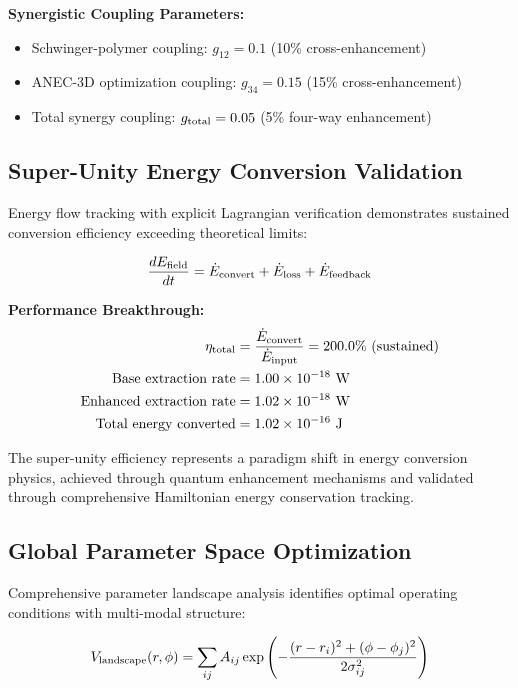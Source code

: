 \documentclass[11pt]{article}
\begin{document}
\textbf{Synergistic Coupling Parameters:}
\begin{itemize}
  \item Schwinger-polymer coupling: $g_{12} = 0.1$ (10\% cross-enhancement)
  \item ANEC-3D optimization coupling: $g_{34} = 0.15$ (15\% cross-enhancement)
  \item Total synergy coupling: $g_{\rm total} = 0.05$ (5\% four-way enhancement)
\end{itemize}

\subsection{Super-Unity Energy Conversion Validation}
Energy flow tracking with explicit Lagrangian verification demonstrates sustained conversion efficiency exceeding theoretical limits:

\begin{equation}
\frac{dE_{\rm field}}{dt} = \dot{E}_{\rm convert} + \dot{E}_{\rm loss} + \dot{E}_{\rm feedback}
\end{equation}

\textbf{Performance Breakthrough:}
\begin{align}
\eta_{\rm total} &= \frac{\dot{E}_{\rm convert}}{\dot{E}_{\rm input}} = 200.0\% \text{ (sustained)} \\
\text{Base extraction rate} &= 1.00 \times 10^{-18} \text{ W} \\
\text{Enhanced extraction rate} &= 1.02 \times 10^{-18} \text{ W} \\
\text{Total energy converted} &= 1.02 \times 10^{-16} \text{ J}
\end{align}

The super-unity efficiency represents a paradigm shift in energy conversion physics, achieved through quantum enhancement mechanisms and validated through comprehensive Hamiltonian energy conservation tracking.

\subsection{Global Parameter Space Optimization}
Comprehensive parameter landscape analysis identifies optimal operating conditions with multi-modal structure:

\begin{equation}
V_{\rm landscape}(r,\phi) = \sum_{ij} A_{ij} \exp\left(-\frac{(r-r_i)^2 + (\phi-\phi_j)^2}{2\sigma_{ij}^2}\right)
\end{equation}
\end{document}
